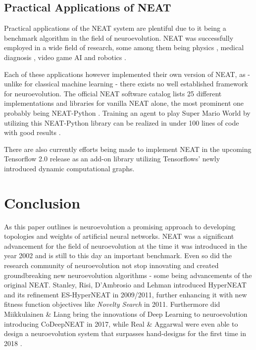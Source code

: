\documentclass[journal, a4paper]{IEEEtran}
\begin{document}

\subsection{Practical Applications of NEAT}

Practical applications of the NEAT system are plentiful due to it being a benchmark algorithm in the field of neuroevolution. NEAT was successfully employed in a wide field of research, some among them being physics \cite{aal09}, medical diagnosis \cite{fra18}, video game AI \cite{hau12} and robotics \cite{cul15}.

Each of these applications however implemented their own version of NEAT, as - unlike for classical machine learning - there exists no well established framework for neuroevolution. The official NEAT software catalog \cite{neat_software19} lists 25 different implementations and libraries for vanilla NEAT alone, the most prominent one probably being NEAT-Python \cite{cod19}. Training an agent to play Super Mario World by utilizing this NEAT-Python library can be realized in under 100 lines of code with good results \cite{pau19_smw}.

There are also currently efforts being made \cite{pau19_tefne} to implement NEAT in the upcoming Tensorflow 2.0 \cite{tf_beta19} release as an add-on \cite{tf_addons19} library utilizing Tensorflows' newly introduced dynamic computational graphs.




\section{Conclusion}

As this paper outlines is neuroevolution a promising approach to developing topologies and weights of artificial neural networks. NEAT was a significant advancement for the field of neuroevolution at the time it was introduced in the year 2002 and is still to this day an important benchmark. Even so did the research community of neuroevolution not stop innovating and created groundbreaking new neuroevolution algorithms - some being advancements of the original NEAT. Stanley, Risi, D'Ambrosio and Lehman introduced HyperNEAT \cite{sta09} and its refinement ES-HyperNEAT \cite{ris11} in 2009/2011, further enhancing it with new fitness function objectives like \textit{Novelty Search} \cite{leh11} in 2011. Furthermore did Miikkulainen \& Liang bring the innovations of Deep Learning to neuroevolution introducing CoDeepNEAT \cite{mii17} in 2017, while Real \& Aggarwal were even able to design a neuroevolution system that surpasses hand-designs for the first time in 2018 \cite{rea19}.
\end{document}
